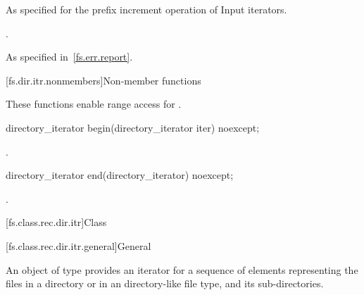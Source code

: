 \begin{itemdescr}
\pnum
\effects
As specified for the prefix increment operation of
Input iterators.

\pnum
\returns
{}.

\pnum
\throws
As specified in~\ref{fs.err.report}.
\end{itemdescr}

[fs.dir.itr.nonmembers]{Non-member functions}

\pnum
These functions enable range access for .

%
\begin{itemdecl}
directory_iterator begin(directory_iterator iter) noexcept;
\end{itemdecl}

\begin{itemdescr}
\pnum
\returns
{}.
\end{itemdescr}

%
\begin{itemdecl}
directory_iterator end(directory_iterator) noexcept;
\end{itemdecl}

\begin{itemdescr}
\pnum
\returns
{}.
\end{itemdescr}

[fs.class.rec.dir.itr]{Class }

[fs.class.rec.dir.itr.general]{General}

%
\pnum
An object of type  provides an iterator for
a sequence of  elements representing the files in a
directory or in an  directory-like file
type, and its sub-directories.

